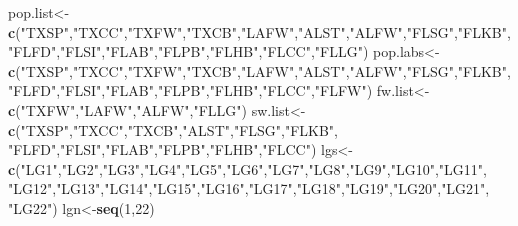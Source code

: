 \documentclass[11pt,]{article}
\newenvironment{Shaded}{\begin{snugshade}}{\end{snugshade}}
\newcommand{\KeywordTok}[1]{\textcolor[rgb]{0.13,0.29,0.53}{\textbf{#1}}}
\newcommand{\DecValTok}[1]{\textcolor[rgb]{0.00,0.00,0.81}{#1}}
\newcommand{\StringTok}[1]{\textcolor[rgb]{0.31,0.60,0.02}{#1}}
\newcommand{\NormalTok}[1]{#1}
\begin{document}
\begin{Shaded}
\begin{Highlighting}[]
\NormalTok{pop.list<-}\KeywordTok{c}\NormalTok{(}\StringTok{"TXSP"}\NormalTok{,}\StringTok{"TXCC"}\NormalTok{,}\StringTok{"TXFW"}\NormalTok{,}\StringTok{"TXCB"}\NormalTok{,}\StringTok{"LAFW"}\NormalTok{,}\StringTok{"ALST"}\NormalTok{,}\StringTok{"ALFW"}\NormalTok{,}\StringTok{"FLSG"}\NormalTok{,}\StringTok{"FLKB"}\NormalTok{,}
    \StringTok{"FLFD"}\NormalTok{,}\StringTok{"FLSI"}\NormalTok{,}\StringTok{"FLAB"}\NormalTok{,}\StringTok{"FLPB"}\NormalTok{,}\StringTok{"FLHB"}\NormalTok{,}\StringTok{"FLCC"}\NormalTok{,}\StringTok{"FLLG"}\NormalTok{)}
\NormalTok{pop.labs<-}\KeywordTok{c}\NormalTok{(}\StringTok{"TXSP"}\NormalTok{,}\StringTok{"TXCC"}\NormalTok{,}\StringTok{"TXFW"}\NormalTok{,}\StringTok{"TXCB"}\NormalTok{,}\StringTok{"LAFW"}\NormalTok{,}\StringTok{"ALST"}\NormalTok{,}\StringTok{"ALFW"}\NormalTok{,}\StringTok{"FLSG"}\NormalTok{,}\StringTok{"FLKB"}\NormalTok{,}
            \StringTok{"FLFD"}\NormalTok{,}\StringTok{"FLSI"}\NormalTok{,}\StringTok{"FLAB"}\NormalTok{,}\StringTok{"FLPB"}\NormalTok{,}\StringTok{"FLHB"}\NormalTok{,}\StringTok{"FLCC"}\NormalTok{,}\StringTok{"FLFW"}\NormalTok{)}
\NormalTok{fw.list<-}\KeywordTok{c}\NormalTok{(}\StringTok{"TXFW"}\NormalTok{,}\StringTok{"LAFW"}\NormalTok{,}\StringTok{"ALFW"}\NormalTok{,}\StringTok{"FLLG"}\NormalTok{)}
\NormalTok{sw.list<-}\KeywordTok{c}\NormalTok{(}\StringTok{"TXSP"}\NormalTok{,}\StringTok{"TXCC"}\NormalTok{,}\StringTok{"TXCB"}\NormalTok{,}\StringTok{"ALST"}\NormalTok{,}\StringTok{"FLSG"}\NormalTok{,}\StringTok{"FLKB"}\NormalTok{,}
    \StringTok{"FLFD"}\NormalTok{,}\StringTok{"FLSI"}\NormalTok{,}\StringTok{"FLAB"}\NormalTok{,}\StringTok{"FLPB"}\NormalTok{,}\StringTok{"FLHB"}\NormalTok{,}\StringTok{"FLCC"}\NormalTok{)}
\NormalTok{lgs<-}\KeywordTok{c}\NormalTok{(}\StringTok{"LG1"}\NormalTok{,}\StringTok{"LG2"}\NormalTok{,}\StringTok{"LG3"}\NormalTok{,}\StringTok{"LG4"}\NormalTok{,}\StringTok{"LG5"}\NormalTok{,}\StringTok{"LG6"}\NormalTok{,}\StringTok{"LG7"}\NormalTok{,}\StringTok{"LG8"}\NormalTok{,}\StringTok{"LG9"}\NormalTok{,}\StringTok{"LG10"}\NormalTok{,}\StringTok{"LG11"}\NormalTok{,}
    \StringTok{"LG12"}\NormalTok{,}\StringTok{"LG13"}\NormalTok{,}\StringTok{"LG14"}\NormalTok{,}\StringTok{"LG15"}\NormalTok{,}\StringTok{"LG16"}\NormalTok{,}\StringTok{"LG17"}\NormalTok{,}\StringTok{"LG18"}\NormalTok{,}\StringTok{"LG19"}\NormalTok{,}\StringTok{"LG20"}\NormalTok{,}\StringTok{"LG21"}\NormalTok{,}
    \StringTok{"LG22"}\NormalTok{)}
\NormalTok{lgn<-}\KeywordTok{seq}\NormalTok{(}\DecValTok{1}\NormalTok{,}\DecValTok{22}\NormalTok{)}

\end{Highlighting}
\end{Shaded}
\end{document}
